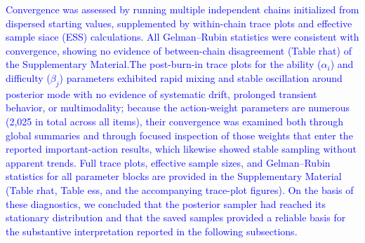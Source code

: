 \documentclass[A4paper,11pt]{article}
\begin{document}
\textcolor{blue}{Convergence was assessed by running multiple independent chains initialized from dispersed starting values, supplemented by within-chain trace plots and effective sample siace (ESS) calculations. All Gelman--Rubin statistics were consistent with convergence, showing no evidence of between-chain disagreement (Table rhat) of the Supplementary Material.The post-burn-in trace plots for the ability ($\alpha_i$) and difficulty ($\beta_j$) parameters exhibited rapid mixing and stable oscillation around posterior mode with no evidence of systematic drift, prolonged transient behavior, or multimodality; because the action-weight parameters are numerous (2{,}025 in total across all items), their convergence was examined both through global summaries and through focused inspection of those weights that enter the reported important-action results, which likewise showed stable sampling without apparent trends. Full trace plots, effective sample sizes, and Gelman--Rubin statistics for all parameter blocks are provided in the Supplementary Material (Table rhat, Table ess, and the accompanying trace-plot figures). On the basis of these diagnostics, we concluded that the posterior sampler had reached its stationary distribution and that the saved samples provided a reliable basis for the substantive interpretation reported in the following subsections.}


\end{document}
